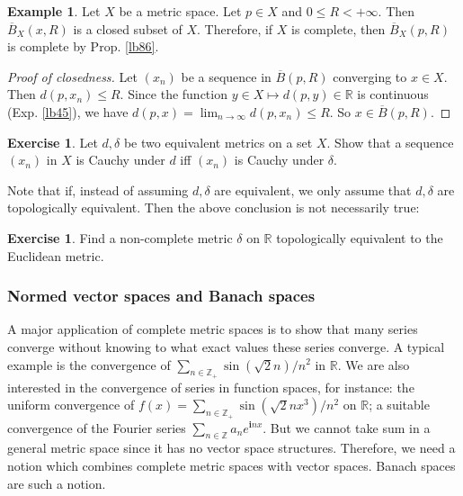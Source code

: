 \documentclass[12pt,b5paper,notitlepage]{article}
\theoremstyle{definition}
\newtheorem{eg}[df]{Example}
\newtheorem{exe}[df]{Exercise}
\theoremstyle{plain}
\newcommand{\ovl}{\overline}
\newcommand{\im}{\mathbf{i}}
\newcommand{\Zbb}{\mathbb Z}
\newcommand{\Rbb}{\mathbb R}
\numberwithin{equation}{section}
\begin{document}
\begin{eg}\label{lb97}
Let $X$ be a metric space. Let $p\in X$ and $0\leq R<+\infty$. Then $\ovl B_X(x,R)$ is a closed subset of $X$. Therefore, if $X$ is complete, then $\ovl B_X(p,R)$ is complete by Prop. \ref{lb86}.
\end{eg}

\begin{proof}[Proof of closedness]
Let $(x_n)$ be a sequence in $\ovl B(p,R)$ converging to $x\in X$. Then $d(p,x_n)\leq R$. Since the function $y\in X\mapsto d(p,y)\in\Rbb$ is continuous (Exp. \ref{lb45}),  we have $d(p,x)=\lim_{n\rightarrow\infty}d(p,x_n)\leq R$. So $x\in\ovl B(p,R)$.
\end{proof}



\begin{exe}
Let $d,\delta$ be two equivalent metrics on a set $X$. Show that a sequence $(x_n)$ in $X$ is Cauchy under $d$ iff $(x_n)$ is Cauchy under $\delta$. 

Note that if, instead of assuming $d,\delta$ are equivalent, we only assume that $d,\delta$ are topologically equivalent. Then the above conclusion is not necessarily true:
\end{exe}


\begin{exe}
Find a non-complete metric $\delta$ on $\Rbb$ topologically equivalent to the Euclidean metric.
\end{exe}








\subsubsection{Normed vector spaces and Banach spaces}



A major application of complete metric spaces is to show that many series converge without knowing to what exact values these series converge. A typical example is the convergence of $\sum_{n\in\Zbb_+}\sin(\sqrt 2n)/n^2$ in $\Rbb$. We are also interested in the convergence of series in function spaces, for instance: the uniform convergence of $f(x)=\sum_{n\in\Zbb_+}\sin(\sqrt 2nx^3)/n^2$ on $\Rbb$; a suitable convergence of the Fourier series $\sum_{n\in\Zbb}a_ne^{\im n x}$. But we cannot take sum in a general metric space since it has no vector space structures. Therefore, we need a notion which combines complete metric spaces with vector spaces. Banach spaces are such a notion. 
\end{document}
